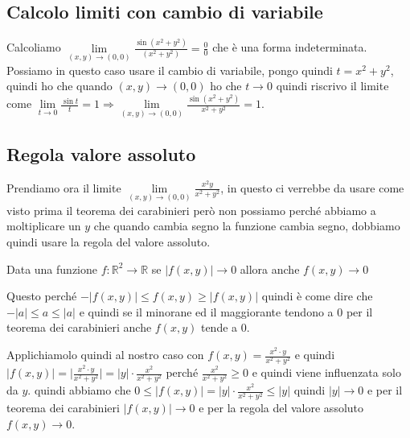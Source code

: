 \subsection{Calcolo limiti con cambio di variabile}
Calcoliamo $\lim\limits_{(x,y) \to (0,0)}\frac{\sin(x^2 + y^2)}{(x^2 + y^2)} = \frac{0}{0}$ che è una forma indeterminata. Possiamo in questo caso usare il cambio di variabile, pongo quindi $t = x^2 + y^2$, quindi ho che quando $(x,y)\to (0,0)$ ho che $t \to 0$ quindi riscrivo il limite come $\lim\limits_{t\to 0}\frac{\sin{t}}{t} = 1 \Longrightarrow \lim\limits_{(x,y)\to (0,0)} \frac{\sin(x^2+y^2)}{x^2+y^2} = 1$.

\subsection{Regola valore assoluto}
Prendiamo ora il limite $\lim\limits_{(x,y)\to (0,0)}\frac{x^2y}{x^2 + y^2}$, in questo ci verrebbe da usare come visto prima il teorema dei carabinieri però non possiamo perché abbiamo a moltiplicare un $y$ che quando cambia segno la funzione cambia segno, dobbiamo quindi usare la regola del valore assoluto.
\begin{proposition}
Data una funzione $f: \mathbb{R}^2 \to \mathbb{R}$ se $|f(x,y)| \to 0$ allora anche $f(x,y) \to 0$
\end{proposition}
\begin{demostration}
Questo perché $-|f(x,y)| \leq f(x,y) \geq |f(x,y)|$ quindi è come dire che $-|a| \leq a \leq |a|$ e quindi se il minorane ed il maggiorante tendono a 0 per il teorema dei carabinieri anche $f(x,y)$ tende a 0.
\end{demostration}
\vspace{-5pt}
\hspace{-15pt}Applichiamolo quindi al nostro caso con $f(x,y) = \frac{x^2 \cdot y}{x^2 + y^2}$ e quindi $|f(x,y)| = \bigg| \frac{x^2 \cdot y}{x^2 + y^2} \bigg| = |y| \cdot \frac{x^2}{x^2 + y^2}$ perché $\frac{x^2}{x^2 + y^2} \geq 0$ e quindi viene influenzata solo da $y$. quindi abbiamo che $0 \leq |f(x,y)| = |y| \cdot \frac{x^2}{x^2+y^2} \leq |y|$ quindi $|y| \to 0$ e per il teorema dei carabinieri $|f(x,y)| \to 0$ e per la regola del valore assoluto $f(x,y) \to 0$.

